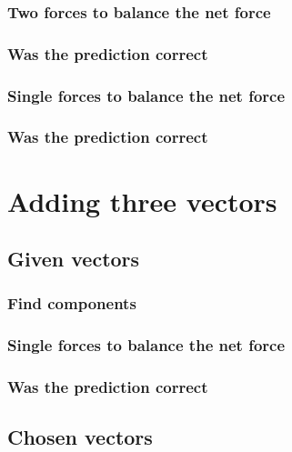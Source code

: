 \documentclass[11pt, letterpaper, includehead]{article}
\begin{document}
\subsubsection{Two forces to balance the net force} %

\subsubsection{Was the prediction correct} %

\subsubsection{Single forces to balance the net force} %

\subsubsection{Was the prediction correct} %

\section{Adding three vectors} %

\subsection{Given vectors} %

\subsubsection{Find components} %

\subsubsection{Single forces to balance the net force} %

\subsubsection{Was the prediction correct} %

\subsection{Chosen vectors} %
\end{document}
